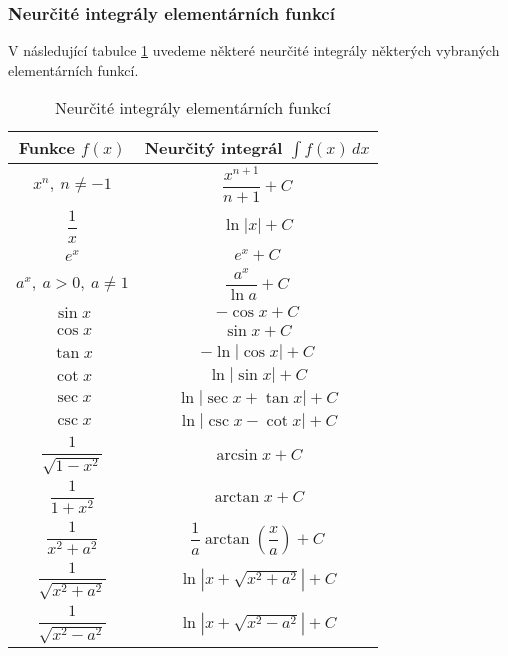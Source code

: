 \subsubsection{Neurčité integrály elementárních funkcí}
V následující tabulce \ref{tab:int} uvedeme některé neurčité integrály některých vybraných elementárních funkcí.
\begin{table}[h!]
\centering
\vspace{0.2cm}
\begin{tabular}{|c|c|}
\hline
\textbf{Funkce \( f(x) \)} & \textbf{Neurčitý integrál \( \int f(x)\,dx \)} \\
\hline
\( x^n,\ n \ne -1 \) & \( \dfrac{x^{n+1}}{n+1} + C \) \\
\hline
\( \dfrac{1}{x} \) & \( \ln|x| + C \) \\
\hline
\( e^x \) & \( e^x + C \) \\
\hline
\( a^x,\ a>0,\ a \ne 1 \) & \( \dfrac{a^x}{\ln a} + C \) \\
\hline
\( \sin x \) & \( -\cos x + C \) \\
\hline
\( \cos x \) & \( \sin x + C \) \\
\hline
\( \tan x \) & \( -\ln|\cos x| + C \) \\
\hline
\( \cot x \) & \( \ln|\sin x| + C \) \\
\hline
\( \sec x \) & \( \ln|\sec x + \tan x| + C \) \\
\hline
\( \csc x \) & \( \ln|\csc x - \cot x| + C \) \\
\hline
\( \dfrac{1}{\sqrt{1 - x^2}} \) & \( \arcsin x + C \) \\
\hline
\( \dfrac{1}{1 + x^2} \) & \( \arctan x + C \) \\
\hline
\( \dfrac{1}{x^2 + a^2} \) & \( \dfrac{1}{a} \arctan\left( \dfrac{x}{a} \right) + C \) \\
\hline
\( \dfrac{1}{\sqrt{x^2 + a^2}} \) & \( \ln\left| x + \sqrt{x^2 + a^2} \right| + C \) \\
\hline
\( \dfrac{1}{\sqrt{x^2 - a^2}} \) & \( \ln\left| x + \sqrt{x^2 - a^2} \right| + C \) \\
\hline
\end{tabular}
\caption{Neurčité integrály elementárních funkcí}
\label{tab:int}
\end{table}

